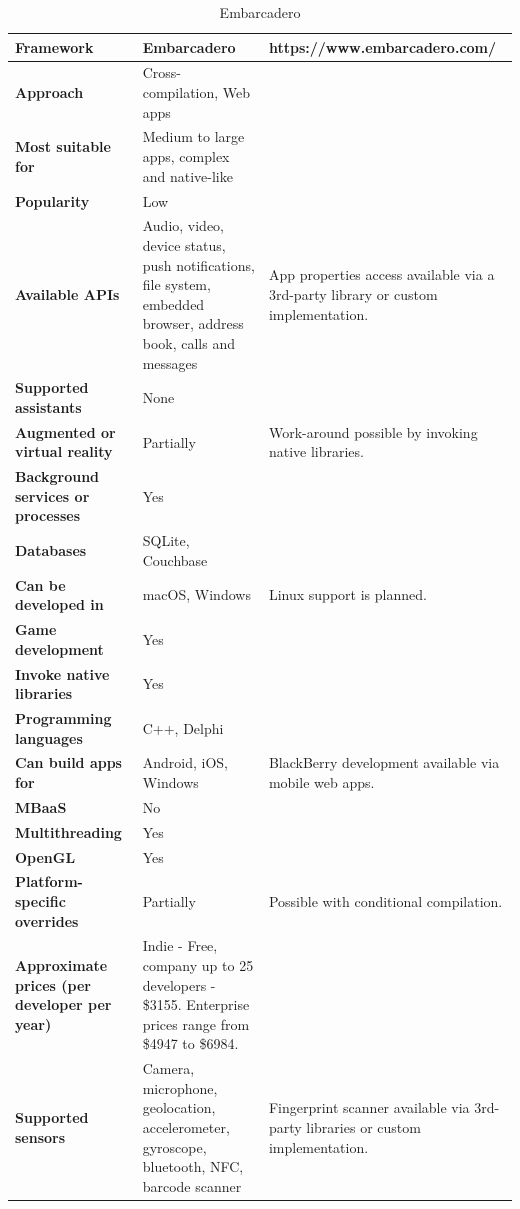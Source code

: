 \documentclass[english,master,public,dept460,male,cpdeclaration,oneside]{diploma}
\begin{document}
\begin{table}[!h]
	\centering
	\caption{Embarcadero}
	\begin{tabular}{p{} | p{} | p{}}
		\toprule		
		\textbf{Framework} & \textbf{Embarcadero} & https://www.embarcadero.com/ \\
		\midrule
		\textbf{Approach} & Cross-compilation, Web apps & \\			
		\midrule	
		\textbf{Most suitable for} & Medium to large apps, complex and native-like & \\
		\midrule
		\textbf{Popularity} & Low & \\			
		\midrule
		\textbf{Available APIs} & Audio, video, device status, push notifications, file system, embedded browser, address book, calls and messages & App properties access available via a 3rd-party library or custom implementation. \\			
		\midrule
		\textbf{Supported assistants} & None & \\			
		\midrule
		\textbf{Augmented or virtual reality} & Partially & Work-around possible by invoking native libraries. \\			
		\midrule
		\textbf{Background services or processes} & Yes &  \\			
		\midrule
		\textbf{Databases} & SQLite, Couchbase & \\			
		\midrule
		\textbf{Can be developed in} & macOS, Windows & Linux support is planned. \\			
		\midrule
		\textbf{Game development} & Yes & \\			
		\midrule
		\textbf{Invoke native libraries} & Yes & \\			
		\midrule
		\textbf{Programming languages} & C++, Delphi & \\			
		\midrule
		\textbf{Can build apps for} & Android, iOS, Windows & BlackBerry development available via mobile web apps. \\			
		\midrule
		\textbf{MBaaS} & No & \\			
		\midrule
		\textbf{Multithreading} & Yes & \\			
		\midrule
		\textbf{OpenGL} & Yes & \\			
		\midrule
		\textbf{Platform-specific overrides} & Partially & Possible with conditional compilation. \\			
		\midrule
		\textbf{Approximate prices (per developer per year)} & Indie - Free, company up to 25 developers - \$3155. Enterprise prices range from \$4947 to \$6984. & \\			
		\midrule
		\textbf{Supported sensors} & Camera, microphone, geolocation, accelerometer, gyroscope, bluetooth, NFC, barcode scanner & Fingerprint scanner available via 3rd-party libraries or custom implementation. \\			
		\midrule
	\end{tabular}
\end{table}
\end{document}
